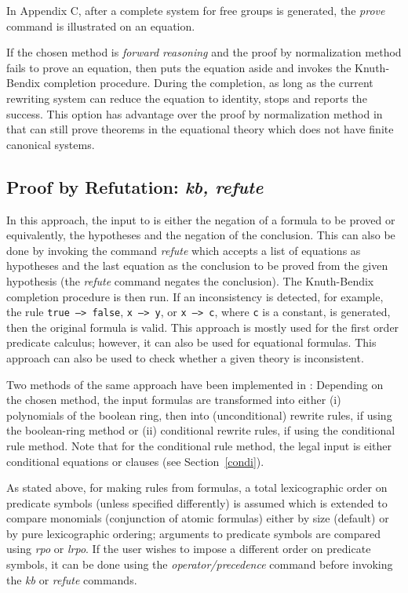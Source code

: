 In Appendix C, after 
a complete system for free groups is generated,
the {\em prove} command is illustrated on an equation.

If the chosen method is {\em forward reasoning} and the proof by normalization
method fails to prove an equation, then \RRL puts the equation aside
and invokes the Knuth-Bendix completion procedure. 
During the completion,
as long as the current rewriting system
can reduce the equation to identity, \RRL stops and reports the success.
This option has advantage over the proof by normalization method
in that \RRL can still prove theorems in the equational theory
which does not have finite canonical systems.

\subsection{Proof by Refutation: \em kb, refute}

In this approach, the input to \RRL
is either the negation of a formula to be proved or equivalently,
the hypotheses and the negation of the conclusion.
This can also be done by invoking the command {\em refute} which
accepts a list of equations as hypotheses and the last equation as the
conclusion to be proved from the given hypothesis
(the {\em refute} command negates the conclusion).  The Knuth-Bendix
completion procedure is then run.  If an inconsistency is detected,
for example, the rule {\tt true --> false}, {\tt x --> y}, or 
{\tt x --> c}, where {\tt c} is a constant, is generated, then the original
formula is valid.  This approach is mostly used for the first order
predicate calculus; however, it can also be used for equational
formulas. This approach can also be used to check whether a given theory
is inconsistent. 

Two methods of the same approach have been implemented in \ERRL:
Depending on the chosen method, the input formulas are
transformed into either 
(i) polynomials of the boolean ring, then
into (unconditional) rewrite rules, if using the boolean-ring method 
or (ii) conditional rewrite rules, if using the conditional rule
method. Note that for the conditional rule method, the legal input
is either conditional equations or clauses (see Section~\ref{condi}).

As stated above, for making rules from formulas,
a total lexicographic order on predicate symbols
(unless specified differently) is assumed which
is extended to compare monomials (conjunction of atomic formulas)
either by size (default) or by pure lexicographic ordering; arguments
to predicate symbols are compared using {\em rpo} or {\em lrpo}. If the user
wishes to impose a different order on predicate symbols,
it can be done using the {\em operator/precedence} command
before invoking the {\em kb} or {\em refute} commands.

